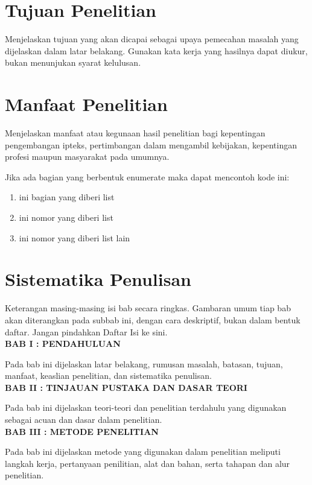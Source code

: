 \section{Tujuan Penelitian}
Menjelaskan tujuan yang akan dicapai sebagai upaya pemecahan masalah yang dijelaskan dalam latar belakang. Gunakan kata kerja yang hasilnya dapat diukur, bukan menunjukan syarat kelulusan.


\section{Manfaat Penelitian}
Menjelaskan manfaat atau kegunaan hasil penelitian bagi kepentingan pengembangan ipteks, pertimbangan dalam mengambil kebijakan, kepentingan profesi maupun masyarakat pada umumnya.

Jika ada bagian yang berbentuk enumerate maka dapat mencontoh kode ini:
\begin{enumerate}[noitemsep]
	\item ini bagian yang diberi list
	\item ini nomor yang diberi list
	\item ini nomor yang diberi list lain
\end{enumerate}

\section{Sistematika Penulisan}
Keterangan masing-masing isi bab secara ringkas. Gambaran umum tiap bab akan diterangkan pada subbab ini, dengan cara deskriptif, bukan dalam bentuk daftar. Jangan pindahkan Daftar Isi ke sini.\\
\noindent
\textbf{BAB I : PENDAHULUAN}

Pada bab ini dijelaskan latar belakang, rumusan masalah, batasan, tujuan, manfaat, keaslian penelitian, dan sistematika penulisan.\\

\noindent
\textbf{BAB II : TINJAUAN PUSTAKA DAN DASAR TEORI}

Pada bab ini dijelaskan teori-teori dan penelitian terdahulu yang digunakan sebagai acuan dan dasar dalam penelitian.\\

\noindent
\textbf{BAB III : METODE PENELITIAN}

Pada bab ini dijelaskan metode yang digunakan dalam penelitian meliputi langkah kerja, pertanyaan penilitian, alat dan bahan, serta tahapan dan alur penelitian.\\

